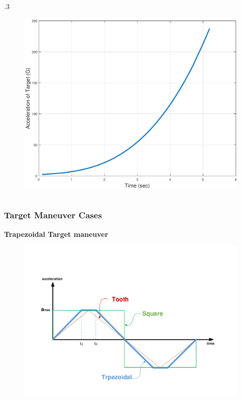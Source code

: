 \documentclass{beamer}
\begin{document}
\begin{frame}
\begin{columns}[c]
		\begin{column} {.3\linewidth}
			\begin{figure}[H]
				\centering
				\includegraphics[scale = 0.18]{fig/TargetAccelerationP4N3.pdf}
			\end{figure}
		\end{column}
		
	\end{columns}
	
\end{frame}

\begin{frame}
\frametitle{Target Maneuver Cases}
\textbf{Trapezoidal Target maneuver}

\begin{figure}[htb]
	\centering
	\includegraphics[scale = 0.35]{fig/toothSquareTrapezoidal.pdf}
\end{figure}
\end{frame}
\end{document}
